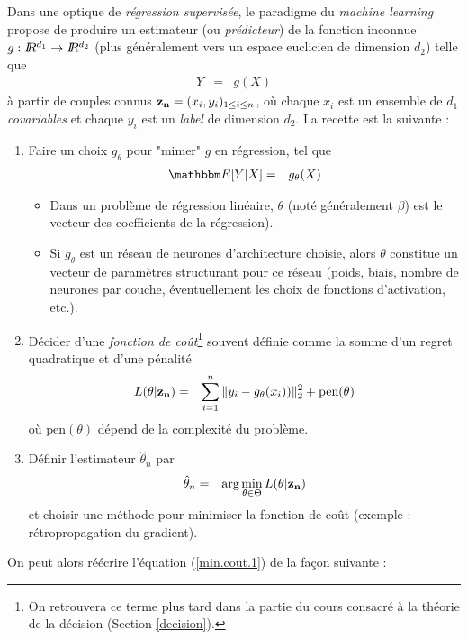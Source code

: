 Dans une optique de \emph{régression supervisée}, le paradigme du \emph{machine learning} propose de produire un estimateur (ou \emph{prédicteur}) de la fonction inconnue $g:I\!\!R^{d_1}\to I\!\!R^{d_2}$ (plus généralement vers un espace euclicien de dimension $d_2$) telle que
\begin{eqnarray*}
Y & =& g(X)
\end{eqnarray*}
à partir de couples connus ${\bf z_n}=(x_i,y_i)_{1\leq i \leq n}$, où chaque $x_i$ est un ensemble de $d_1 $\emph{covariables}  et chaque $y_i$ est un \emph{label} de dimension $d_2$. La recette est la suivante :
\begin{enumerate}
\item Faire un choix $g_{\theta}$ pour "mimer" $g$ en régression, tel que
\begin{eqnarray*}
\E[Y|X] & = & g_{\theta}(X)
\end{eqnarray*}
\begin{itemize}
    \item Dans un problème de régression linéaire, $\theta$ (noté généralement $\beta$) est le vecteur des coefficients de la régression).
    \item  Si $g_{\theta}$ est un réseau de neurones d'architecture choisie, alors $\theta$ constitue un vecteur de paramètres structurant pour ce réseau (poids, biais, nombre de neurones par couche, éventuellement les choix de fonctions d'activation, etc.).
\end{itemize}

\item Décider d'une \emph{fonction de coût}\footnote{On retrouvera ce terme plus tard dans la partie du cours consacré à la théorie de la décision (Section \ref{decision}).} souvent définie comme la somme d'un regret quadratique et d'une pénalité 
\begin{eqnarray}
L(\theta|{\bf z_n}) & = & \sum\limits_{i=1}^n \|y_i-g_{\theta}(x_i))\|^2_2 + \mbox{pen}(\theta) \label{cout.1}
\end{eqnarray}
où $\mbox{pen}(\theta)$ dépend de la complexité du problème.
\item Définir l'estimateur $\hat\theta_n$ par
\begin{eqnarray}
\hat{\theta}_n & = & \arg\min\limits_{\theta\in\Theta} L(\theta|{\bf z_n}) \label{min.cout.1}
\end{eqnarray}
et choisir une méthode pour minimiser la fonction de coût (exemple : rétropropagation du gradient).
\end{enumerate}
On peut alors réécrire l'équation (\ref{min.cout.1}) de la fa\c con suivante :
